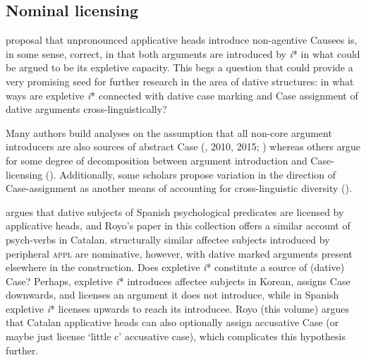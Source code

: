 \documentclass[output=paper,modfonts,nonflat,colorlinks,citecolor=brown]{langsci/langscibook}
\begin{document}
\subsection{Nominal licensing}\label{sec:wechsler:4.2}

 proposal that unpronounced applicative heads introduce non-agentive Causees is, in some sense, correct, in that both arguments are introduced by \textit{i}* in what could be argued to be its expletive capacity. This begs a question that could provide a very promising seed for further research in the area of dative structures: in what ways are expletive \textit{i}* connected with dative case marking and Case assignment of dative arguments cross-linguistically? 



Many authors build analyses on the assumption that all non-core argument introducers are also sources of abstract Case (\citealt{MchomboFirmino1999,Jeong2007,Cuervo2003}, 2010, 2015; \citealt{Sheehan2013,vanderWal2017}) whereas others argue for some degree of decomposition between argument introduction and Case-licensing (\citealt{BakerCollins2006,GeorgalaEtAl2008,Georgala2012,HaddicanHolmberg2012,Halpert2012,Wechsler2014,Wechsler2016}). Additionally, some scholars propose variation in the direction of Case-assignment as another means of accounting for cross-linguistic diversity (\citealt{Sheehan2013,vanderWal2017,Baker2008}). 



\citet{Cuervo2003,Cuervo2010} argues that dative subjects of Spanish psychological predicates are licensed by applicative heads, and Royo’s paper in this collection offers a similar account of psych-verbs in Catalan.  structurally similar affectee subjects introduced by peripheral \textsc{appl} are nominative, however, with dative marked arguments present elsewhere in the construction. Does expletive \textit{i}* constitute a source of (dative) Case? Perhaps, expletive \textit{i}* introduces affectee subjects in Korean, assigns Case downwards, and licenses an argument it does not introduce, while in Spanish expletive \textit{i}* licenses upwards to reach its introducee. Royo (this volume) argues that Catalan applicative heads can also optionally assign accusative Case (or maybe just license ‘little c’ accusative case), which complicates this hypothesis further. 
\end{document}
